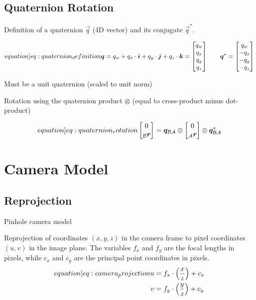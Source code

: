 \subsection{Quaternion Rotation}

Definition of a quaternion $\vec q$ (4D vector) and its conjugate $\vec q^*$.

\begin{equation}
    \label[equation]{eq:quaternion_definition}
    \vec q = q_w + q_x\cdot \vec i + q_y\cdot \vec j + q_z\cdot \vec k = \begin{bmatrix} q_w \\ q_x \\ q_y \\ q_z \end{bmatrix} \qquad
    \vec q^* = \begin{bmatrix} q_w \\ -q_x \\ -q_y \\ -q_z \end{bmatrix}
\end{equation}

Must be a unit quaternion (scaled to unit norm)

Rotation using the quaternion product $\otimes$ (equal to cross-product minus dot-product)

\begin{equation}
    \label[equation]{eq:quaternion_rotation}
    \begin{bmatrix} 0 \\ _\mathcal B \vec r \end{bmatrix} = \vec q_{\mathcal B \mathcal A} \otimes \begin{bmatrix} 0 \\ _\mathcal A \vec r \end{bmatrix} \otimes \vec q_{\mathcal B \mathcal A}^*
\end{equation}

\section{Camera Model}

\subsection{Reprojection}

Pinhole camera model

Reprojection of coordinates $(x,y,z)$ in the camera frame to pixel coordinates $(u,v)$ in the image plane. The variables $f_x$ and $f_y$ are the focal lengths in pixels, while $c_x$ and $c_y$ are the principal point coordinates in pixels.
\begin{align}
    \label[equation]{eq:camera_projection}
    u &= f_x \cdot \Big(\frac{x}{z}\Big) + c_x \\
    v &= f_y \cdot \Big(\frac{y}{z}\Big) + c_y
\end{align}

